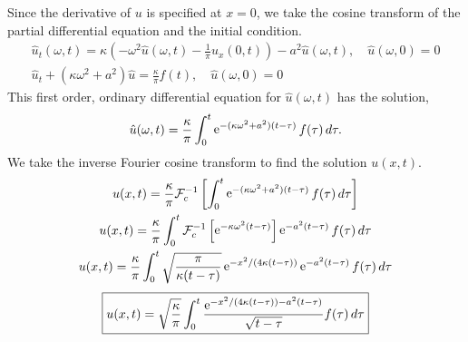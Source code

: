 {%
\begin{Solution}
  Since the derivative of $u$ is specified at $x = 0$, we take the cosine 
  transform of the partial differential equation and the initial condition.
  \begin{gather*}
    \hat{u}_t(\omega,t) = \kappa \left( - \omega^2 \hat{u}(\omega,t) 
      - \frac{1}{\pi} u_x(0,t) \right) - a^2 \hat{u}(\omega,t), \quad
    \hat{u}(\omega,0) = 0 \\
    \hat{u}_t + \left( \kappa \omega^2 + a^2 \right) \hat{u} 
    = \frac{\kappa}{\pi} f(t), \quad \hat{u}(\omega,0) = 0
  \end{gather*}
  This first order, ordinary differential equation for $\hat{u}(\omega,t)$
  has the solution,
  \[
  \hat{u}(\omega,t) = \frac{\kappa}{\pi} \int_0^t \mathop{\mathrm{e}}\nolimits^{- (\kappa \omega^2 + a^2)
    (t - \tau) } f(\tau) \,d\tau.
  \]
  We take the inverse Fourier cosine transform to find the solution $u(x,t)$.
  \begin{gather*}
    u(x,t) = \frac{\kappa}{\pi} \mathcal{F}_c^{-1} \left[        
      \int_0^t \mathop{\mathrm{e}}\nolimits^{- (\kappa \omega^2 + a^2)
        (t - \tau) } f(\tau) \,d\tau \right] \\
    u(x,t) = \frac{\kappa}{\pi} 
    \int_0^t \mathcal{F}_c^{-1} \left[ \mathop{\mathrm{e}}\nolimits^{- \kappa \omega^2
        (t - \tau) } \right] \mathop{\mathrm{e}}\nolimits^{-a^2 (t - \tau)} f(\tau) \,d\tau \\
    u(x,t) = \frac{\kappa}{\pi} 
    \int_0^t \sqrt{ \frac{\pi}{\kappa (t-\tau)} } 
    \mathop{\mathrm{e}}\nolimits^{- x^2 / (4 \kappa (t - \tau)) }
    \mathop{\mathrm{e}}\nolimits^{-a^2 (t - \tau)} f(\tau) \,d\tau 
  \end{gather*}
  \[
  \boxed{
    u(x,t) = \sqrt{ \frac{\kappa}{\pi} } \int_0^t
    \frac{ \mathop{\mathrm{e}}\nolimits^{- x^2 / (4 \kappa (t - \tau)) - a^2 (t - \tau)} }
    { \sqrt{t-\tau} }
    f(\tau) \,d\tau 
    }
  \]
\end{Solution}







}
